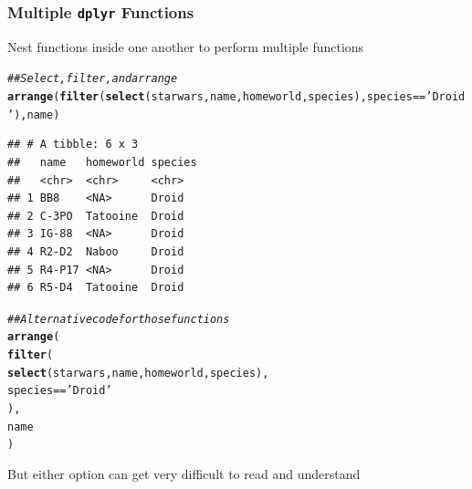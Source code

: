 \documentclass{beamer}\usepackage[]{graphicx}\usepackage[]{color}
\makeatletter
\newcommand{\hlstr}[1]{\textcolor[rgb]{0.192,0.494,0.8}{#1}}%
\newcommand{\hlcom}[1]{\textcolor[rgb]{0.678,0.584,0.686}{\textit{#1}}}%
\newcommand{\hlopt}[1]{\textcolor[rgb]{0,0,0}{#1}}%
\newcommand{\hlstd}[1]{\textcolor[rgb]{0.345,0.345,0.345}{#1}}%
\newcommand{\hlkwd}[1]{\textcolor[rgb]{0.737,0.353,0.396}{\textbf{#1}}}%
\newenvironment{kframe}{%
 \def\at@end@of@kframe{}%
 \ifinner\ifhmode%
  \def\at@end@of@kframe{\end{minipage}}%
  \begin{minipage}{\columnwidth}%
 \fi\fi%
 \def\FrameCommand##1{\hskip\@totalleftmargin \hskip-\fboxsep
 \colorbox{shadecolor}{##1}\hskip-\fboxsep
     \hskip-\linewidth \hskip-\@totalleftmargin \hskip\columnwidth}%
 \MakeFramed {\advance\hsize-\width
   \@totalleftmargin\z@ \linewidth\hsize
   \@setminipage}}%
 {\par\unskip\endMakeFramed%
 \at@end@of@kframe}
\newenvironment{knitrout}{}{} %
\makeatother
\begin{document}
\begin{frame}[fragile]\frametitle{Multiple \texttt{dplyr} Functions}
    Nest functions inside one another to perform multiple functions
\begin{knitrout}\footnotesize
{}\color{fgcolor}\begin{kframe}
\begin{alltt}
\hlcom{## Select, filter, and arrange}
\hlkwd{arrange}\hlstd{(}\hlkwd{filter}\hlstd{(}\hlkwd{select}\hlstd{(starwars, name, homeworld, species), species} \hlopt{==} \hlstr{'Droid'}\hlstd{), name)}
\end{alltt}
\begin{verbatim}
## # A tibble: 6 x 3
##   name   homeworld species
##   <chr>  <chr>     <chr>  
## 1 BB8    <NA>      Droid  
## 2 C-3PO  Tatooine  Droid  
## 3 IG-88  <NA>      Droid  
## 4 R2-D2  Naboo     Droid  
## 5 R4-P17 <NA>      Droid  
## 6 R5-D4  Tatooine  Droid
\end{verbatim}
\end{kframe}
\end{knitrout}
\begin{knitrout}\footnotesize
{}\color{fgcolor}\begin{kframe}
\begin{alltt}
\hlcom{## Alternative code for those functions}
\hlkwd{arrange}\hlstd{(}
  \hlkwd{filter}\hlstd{(}
    \hlkwd{select}\hlstd{(starwars, name, homeworld, species),}
    \hlstd{species} \hlopt{==} \hlstr{'Droid'}
  \hlstd{),}
  \hlstd{name}
\hlstd{)}
\end{alltt}
\end{kframe}
\end{knitrout}
    But either option can get very difficult to read and understand
\end{frame}
\end{document}
